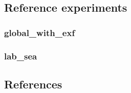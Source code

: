 
\subsection{Reference experiments}

\subsubsection{global\_with\_exf}

\subsubsection{lab\_sea}


\subsection{References}
